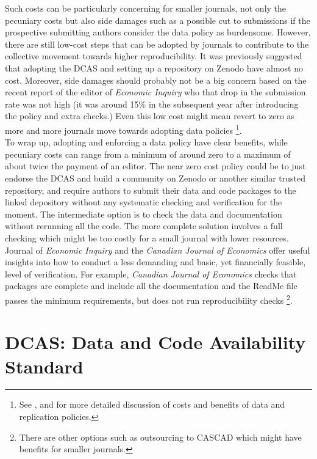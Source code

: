 \documentclass[11pt]{article}
\begin{document}
Such costs can be particularly concerning for smaller journals, not only the pecuniary costs but also side damages such as a possible cut to submissions if the prospective submitting authors consider the data policy as burdensome. However, there are still low-cost steps that can be adopted by journals to contribute to the collective movement towards higher reproducibility. It was previously suggested that adopting the DCAS and setting up a repository on Zenodo have almost no cost. Moreover, side damages should probably not be a big concern based on the recent report of the editor of \textit{Economic Inquiry} who that drop in the submission rate was not high (it was around 15\% in the subsequent year after introducing the policy and extra checks.) Even this low cost might mean revert to zero as more and more journals move towards adopting data policies \footnote{See \cite{whited2023Costs}, \cite{chang2015economics} and \cite{anderson2008role} for more detailed discussion of costs and benefits of data and replication policies.}. \\


To wrap up, adopting and enforcing a data policy have clear benefits, while pecuniary costs can range from a minimum of around zero to a maximum of about twice the payment of an editor. The near zero cost policy could be to just endorse the DCAS and build a community on Zenodo or another similar trusted repository, and require authors to submit their data and code packages to the linked depository without any systematic checking and verification for the moment. The intermediate option is to check the data and documentation without rerunning all the code. The more complete solution involves a full checking which might be too costly for a small journal with lower resources. Journal of \textit{Economic Inquiry} and the \textit{Canadian Journal of Economics} offer useful insights into how to conduct a less demanding and basic, yet financially feasible, level of verification. For example, \textit{Canadian Journal of Economics} checks that packages are complete and include all the documentation and the ReadMe file passes the minimum requirements, but does not run reproducibility checks \footnote{There are other options such as outsourcing to CASCAD which might have benefits for smaller journals.}.




\newpage
\appendix
\section{DCAS: Data and Code Availability Standard}
\label{dcas}
\end{document}
